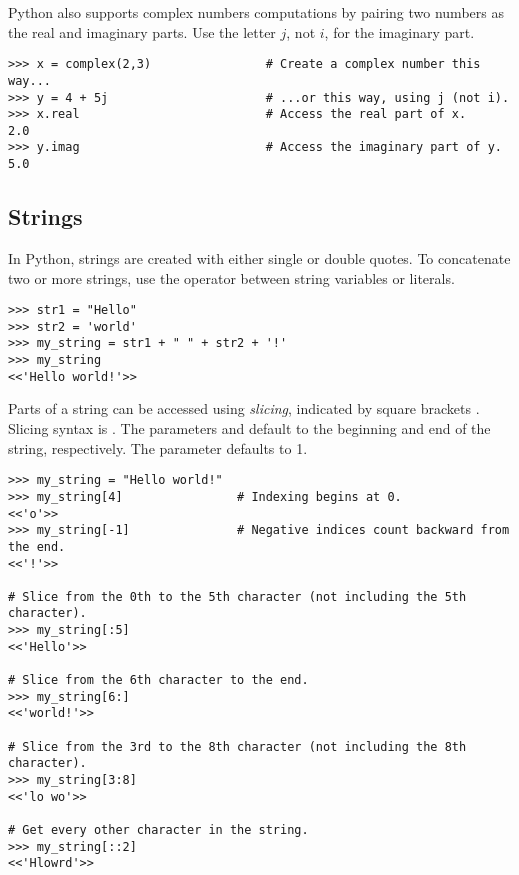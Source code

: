 Python also supports complex numbers computations by pairing two numbers as the real and imaginary parts.
Use the letter $j$, not $i$, for the imaginary part.
\begin{lstlisting}
>>> x = complex(2,3)                # Create a complex number this way...
>>> y = 4 + 5j	                    # ...or this way, using j (not i).
>>> x.real                          # Access the real part of x.
2.0
>>> y.imag                          # Access the imaginary part of y.
5.0
\end{lstlisting}

\subsection*{Strings} %

In Python, strings are created with either single or double quotes.
To concatenate two or more strings, use the \li{+} operator between string variables or literals.
\begin{lstlisting}
>>> str1 = "Hello"
>>> str2 = 'world'
>>> my_string = str1 + " " + str2 + '!'
>>> my_string
<<'Hello world!'>>
\end{lstlisting}

Parts of a string can be accessed using \emph{slicing}, indicated by square brackets \li{[ ]}.
Slicing syntax is .
The parameters  and  default to the beginning and end of the string, respectively.
The parameter  defaults to 1.

\begin{lstlisting}
>>> my_string = "Hello world!"
>>> my_string[4]                # Indexing begins at 0.
<<'o'>>
>>> my_string[-1]               # Negative indices count backward from the end.
<<'!'>>

# Slice from the 0th to the 5th character (not including the 5th character).
>>> my_string[:5]
<<'Hello'>>

# Slice from the 6th character to the end.
>>> my_string[6:]
<<'world!'>>

# Slice from the 3rd to the 8th character (not including the 8th character).
>>> my_string[3:8]
<<'lo wo'>>

# Get every other character in the string.
>>> my_string[::2]
<<'Hlowrd'>>
\end{lstlisting}

